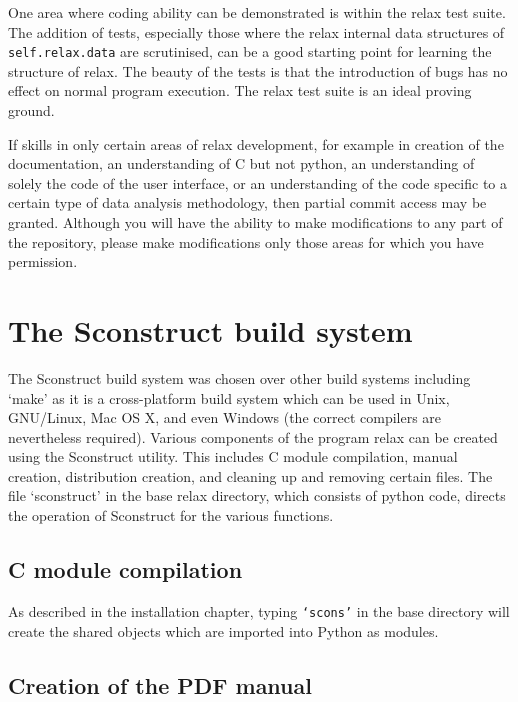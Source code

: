 One area where coding ability can be demonstrated is within the relax test suite.  The addition of tests, especially those where the relax internal data structures of \texttt{self.relax.data} are scrutinised, can be a good starting point for learning the structure of relax.  The beauty of the tests is that the introduction of bugs has no effect on normal program execution.  The relax test suite is an ideal proving ground.

If skills in only certain areas of relax development, for example in creation of the documentation, an understanding of C but not python, an understanding of solely the code of the user interface, or an understanding of the code specific to a certain type of data analysis methodology, then partial commit access may be granted.  Although you will have the ability to make modifications to any part of the repository, please make modifications only those areas for which you have permission.




\section{The Sconstruct build system}

The Sconstruct build system was chosen over other build systems including `make' as it is a cross-platform build system which can be used in Unix, GNU/Linux, Mac OS X, and even Windows (the correct compilers are nevertheless required).  Various components of the program relax can be created using the Sconstruct utility.  This includes C module compilation, manual creation, distribution creation, and cleaning up and removing certain files.  The file `sconstruct' in the base relax directory, which consists of python code, directs the operation of Sconstruct for the various functions.


\subsection{C module compilation}

As described in the installation chapter, typing \texttt{`scons'} in the base directory will create the shared objects which are imported into Python as modules.


\subsection{Creation of the PDF manual}

